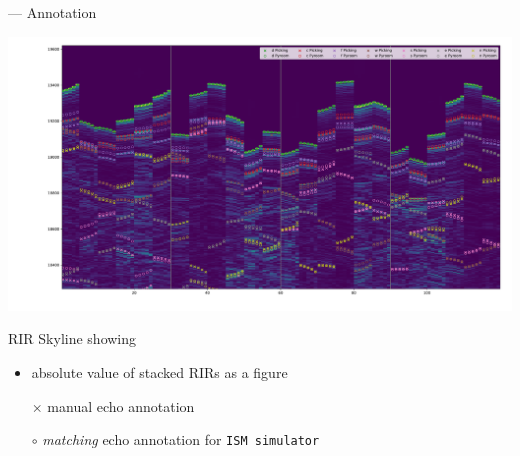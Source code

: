 \begin{frame}{\dechorate --- Annotation}
    \begin{center}
        \includegraphics[trim={10em 0 0 0},clip,width=\linewidth]{figures/dechorate/rir_skyline_final_mod4paper.pdf}
    \end{center}

    \vspace*{-2mm}
    RIR Skyline showing
    \begin{itemize}
        \item absolute value of stacked RIRs as a figure
        \item[$\times$] manual echo annotation
        \item[$\circ$] \textit{matching} echo annotation for \texttt{ISM simulator}
    \end{itemize}
\end{frame}


